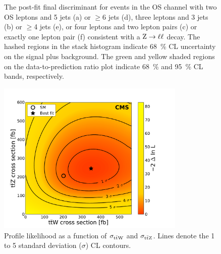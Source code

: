 \begin{figure}[tb]
\begin{subfigure}{0.33\textwidth}
    \caption{}
  \end{subfigure}%
  \caption[Final discriminant for events in the \ttZ channel]{
    The post-fit final discriminant for events in the OS \ttZ channel with two
    OS leptons and 5 jets (a) or $\geq$6 jets (d), three leptons and 3 jets (b)
    or $\geq$4 jets (e), or four leptons and two lepton pairs (c) or exactly one
    lepton pair (f) consistent with a $\text{Z} \rightarrow \ell\ell$ decay. The
    hashed regions in the stack histogram indicate \SI{68}{\percent} CL
    uncertainty on the signal plus background. The green and yellow shaded
    regions on the data-to-prediction ratio plot indicate \SI{68}{\percent} and
    \SI{95}{\percent} CL bands, respectively.
  }
  \label{fig:8-postfit-bdt-ttZ}
\end{figure}

\begin{figure}[tb]
  \centering
  \includegraphics[width=0.8\textwidth]{figures/eight-TeV/z_color_map_and_contour_5_sigma_ttZ_ttW_2d_v4_all_stats}
  \caption[Profile likelihood for simultaneous fit as a function of
  $\sigma_{\ttZ}$ and $\sigma_{\ttW}$]{Profile likelihood as a function of
    $\sigma_{\ttW}$ and $\sigma_{\ttZ}$. Lines denote the 1 to 5 standard
    deviation ($\sigma$) CL contours.
  }
  \label{fig:8-2d-ttZ-ttW}
\end{figure}
